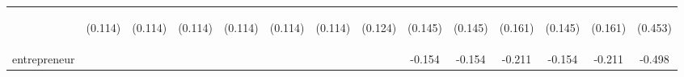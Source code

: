 \begin{center}
\begin{tabular}{lccccccccccccc}
\vspace{4pt} & \begin{footnotesize}(0.114)\end{footnotesize} & \begin{footnotesize}(0.114)\end{footnotesize} & \begin{footnotesize}(0.114)\end{footnotesize} & \begin{footnotesize}(0.114)\end{footnotesize} & \begin{footnotesize}(0.114)\end{footnotesize} & \begin{footnotesize}(0.114)\end{footnotesize} & \begin{footnotesize}(0.124)\end{footnotesize} & \begin{footnotesize}(0.145)\end{footnotesize} & \begin{footnotesize}(0.145)\end{footnotesize} & \begin{footnotesize}(0.161)\end{footnotesize} & \begin{footnotesize}(0.145)\end{footnotesize} & \begin{footnotesize}(0.161)\end{footnotesize} & \begin{footnotesize}(0.453)\end{footnotesize} \\
entrepreneur &  &  &  &  &  &  &  & -0.154 & -0.154 & -0.211 & -0.154 & -0.211 & -0.498 \\

\end{tabular}
\end{center}

